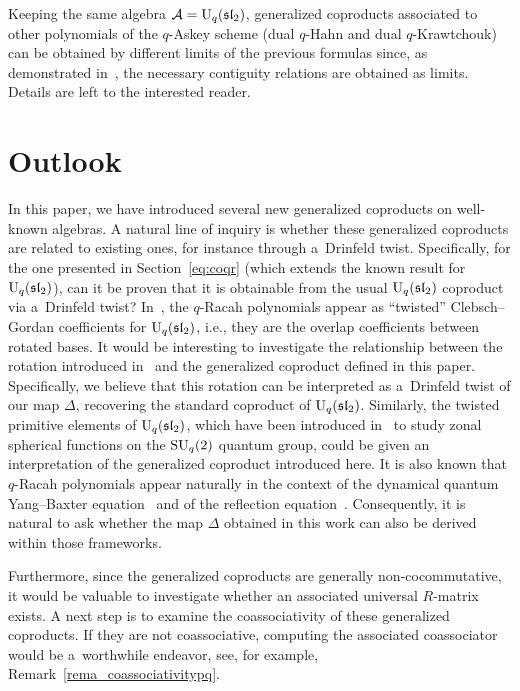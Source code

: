 \documentclass[10pt,a4paper]{amsart}
\numberwithin{equation}{section}
\theoremstyle{definition}
\begin{document}
Keeping the same algebra $\mathcal{A}={\rm U}_q(\mathfrak{sl}_2)$, generalized coproducts associated to other polynomials of the $q$-Askey scheme (dual $q$-Hahn and dual $q$-Krawtchouk) can be obtained by different limits of the previous formulas since, as demonstrated in~\cite{contiguity}, the necessary contiguity relations are obtained as limits. Details are left to the interested reader.

\section{Outlook}\label{sec:outlook}

In this paper, we have introduced several new generalized coproducts on well-known algebras.
A natural line of inquiry is whether these generalized coproducts are related to existing ones, for instance through a~Drinfeld twist. Specifically, for the one presented in Section~\ref{eq:coqr} (which extends the known result for ${\rm U}_q(\mathfrak{sl}_2)$), can it be proven that it is obtainable from the usual ${\rm U}_q(\mathfrak{sl}_2)$ coproduct via a~Drinfeld twist? In~\cite{GZ92}, the $q$-Racah polynomials appear as ``twisted'' Clebsch--Gordan coefficients for ${\rm U}_q(\mathfrak{sl}_2)$, i.e., they are the overlap coefficients between rotated bases. It would be interesting to investigate the relationship between the rotation introduced in~\cite{GZ92} and the generalized coproduct defined in this paper. Specifically, we believe that this rotation can be interpreted as a~Drinfeld twist of our map $\Delta$, recovering the standard coproduct of ${\rm U}_q(\mathfrak{sl}_2)$.
Similarly, the twisted primitive elements of ${\rm U}_q(\mathfrak{sl}_2)$, which have been introduced in~\cite{Koelink96, Koor93,NM90} to study zonal spherical functions on the ${\rm SU}_q(2)$ quantum group, could be given an interpretation of the generalized coproduct introduced here. It is also known that $q$-Racah polynomials appear naturally in the context of the dynamical quantum Yang--Baxter equation~\cite{KR01} and of the reflection equation~\cite{Bas}. Consequently, it is natural to ask whether the map $\Delta$ obtained in this work can also be derived within those frameworks.

Furthermore, since the generalized coproducts are generally non-cocommutative, it would be valuable to investigate whether an associated universal $R$-matrix exists. A next step is to examine the coassociativity of these generalized coproducts. If they are not coassociative, computing the associated coassociator would be a~worthwhile endeavor, see, for example, Remark~\ref{rema_coassociativitypq}.
\end{document}
